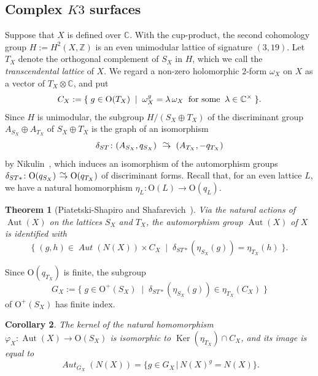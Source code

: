 \documentclass{amsart}
\theoremstyle{plain}
\newtheorem{theorem}{Theorem}[section]
\newtheorem{corollary}[theorem]{Corollary}
\theoremstyle{definition}
\theoremstyle{remark}
\numberwithin{equation}{section}
\numberwithin{table}{section}
\numberwithin{figure}{section}
\newcommand{\C}{\mathord{\mathbb C}}
\newcommand{\Z}{\mathord{\mathbb Z}}
\newcommand{\isom}{\mathbin{\,\raise -.6pt\rlap{$\to$}\raise 3.5pt \hbox{\hskip .3pt$\mathord{\sim}$}\;}}
\newcommand{\set}[2]{\{\; {#1} \; \mid \; {#2} \;  \}}
\newcommand{\shortset}[2]{\{ {#1} \,|\, {#2}   \}}
\newcommand{\tensor}{\otimes}
\newcommand{\sptimes}{\sp{\times}}
\newcommand{\OG}{\mathord{\mathrm {O}}}
\newcommand{\Ker}{\operatorname{\mathrm {Ker}}\nolimits}
\newcommand{\Aut}{\operatorname{\mathrm {Aut}}\nolimits}
\newcommand{\aut}{\operatorname{\mathit {Aut}}\nolimits}
\newcommand{\Nc}{N}
\begin{document}
\subsection{Complex $K3$ surfaces}\label{subsec:AutXC}
Suppose that  $X$ is defined over $\C$.
With the cup-product, 
the second cohomology group $H:=H^2(X, \Z)$ is an even unimodular lattice of signature
$(3, 19)$.
Let $T_X$ denote the orthogonal complement of ${S_X}$ in $H$,
which we call the \emph{transcendental lattice} of $X$.
We  regard a non-zero holomorphic $2$-form $\omega_X$ on $X$ as a vector of ${T_X}\tensor\C$, and put
%
\begin{equation}\label{eq:CX}
C_{X}:=\set{g\in \OG({T_X})}{\omega_X^g=\lambda\, \omega_X\;\;\textrm{for some}\;\; \lambda\in \C\sptimes}.
\end{equation}
%
Since $H$ is  unimodular,
the subgroup $H/({S_X}\oplus {T_X})$ of the discriminant group $A_{S_X}\oplus A_{T_X}$
of ${S_X}\oplus {T_X}$ 
is the graph of an isomorphism
$$
\delta_{ST}\colon (A_{S_X}, q_{S_X})\;\isom\;(A_{T_X}, -q_{T_X})
$$
by  Nikulin~\cite[Proposition~1.6.1]{MR525944}, 
which induces an isomorphism of the automorphism groups 
$\delta_{ST*}\colon \OG(q_{S_X})\isom \OG(q_{T_X})$
of discriminant forms.
Recall that, for an even lattice $L$,   we have a natural homomorphism $\eta_L\colon \OG(L)\to \OG(q_L)$.
%
\begin{theorem}[Piatetski-Shapiro and Shafarevich~\cite{MR0284440}]\label{thm:aut} 
Via the natural actions of $\Aut(X)$ on the lattices ${S_X}$ and  ${T_X}$, 
the automorphism group $\Aut(X)$ of $X$ is identified with 
$$
\set{(g, h)\in \aut(\Nc(X))\times C_{X}}{\delta_{ST*}(\eta_{S_X}(g))=\eta_{T_X}(h)}.
$$
\end{theorem}
%
%
Since $\OG(q_{T_X})$ is finite,
the subgroup
%
\begin{equation}\label{eq:GXcomplex}
G_X:=\set{g\in \OG^+({S_X})}{\delta_{ST*}(\eta_{S_X}(g)) \in \eta_{T_X}(C_X)}
\end{equation}
%
of $\OG^+({S_X})$
has  finite index.
%
\begin{corollary}\label{cor:KerIm}
The kernel of the natural homomorphism $\varphi_X\colon \Aut(X)\to \OG(S_X)$
is isomorphic to $\Ker (\eta_{T_X}) \cap {C_X}$, and its image 
is equal to 
$$
\aut_{G_X}(\Nc(X))=\shortset{g\in G_X}{\Nc(X)^g=\Nc(X)}.
$$
\end{corollary}
%
%
%
\end{document}
